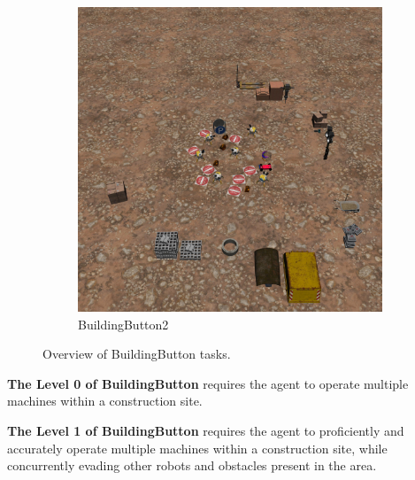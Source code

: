 \documentclass{article}
\begin{document}
\begin{figure}[H]
\begin{subfigure}{0.3\linewidth}
        \centering
        \includegraphics[width=\linewidth]{assets/appendix/building_button2.pdf}
        \caption{BuildingButton2}
      \end{subfigure}
      \caption{Overview of BuildingButton tasks.}
\end{figure}


\textbf{The Level 0 of BuildingButton} requires the agent to operate multiple machines within a construction site.

\textbf{The Level 1 of BuildingButton} requires the agent to proficiently and accurately operate multiple machines within a construction site, while concurrently evading other robots and obstacles present in the area.
\end{document}

